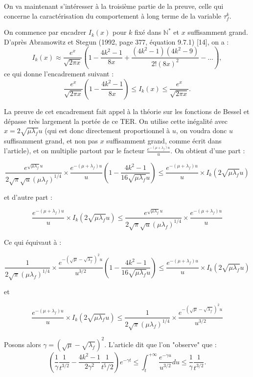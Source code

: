\documentclass[12pt,a4paper]{article}
\begin{document}
On va maintenant s'intéresser à la troisième partie de la preuve, celle qui concerne la caractérisation du comportement à long terme de la variable $\tau_f^k$. \par 

On commence par encadrer $I_k(x)$ pour $k$ fixé dans $\mathbb{N}^*$ et $x$ suffisamment grand. D'après Abramowitz et Stegun (1992, page 377, équation 9.7.1) [14], on a : 
$$ I_k(x) \approx \frac{e^x}{\sqrt{2\pi x}} (1 - \frac{4k^2-1}{8x} + \frac{(4k^2-1)(4k^2-9)}{2! (8x)^2} - ...), $$
ce qui donne l'encadrement suivant : 
\begin{equation}
    \frac{e^x}{\sqrt{2\pi x}} (1 - \frac{4k^2 -1}{8x}) \leq I_k(x) \leq  \frac{e^x}{\sqrt{2\pi x}}.
\end{equation}


La preuve de cet encadrement fait appel à la théorie sur les fonctions de Bessel et dépasse très largement la portée de ce TER. 
On utilise cette inégalité avec $x=2\sqrt{\mu \lambda_f}u$ (qui est donc directement proportionnel à $u$, on voudra donc $u$ suffisamment grand, et non pas $x$ suffisamment grand, comme écrit dans l'article), et on multiplie partout par le facteur $\frac{e^{-(\mu+\lambda_f)u}}{u}$. On obtient d'une part :

$$ \frac{e^{\sqrt{\mu \lambda_f}u}}{2\sqrt{\pi}\sqrt{u}(\mu \lambda_f)^{1/4}} \times \frac{e^{-(\mu+\lambda_f)u}}{u} (1 - \frac{4k^2-1}{16\sqrt{\mu \lambda_f}u}) \leq \frac{e^{-(\mu+\lambda_f)u}}{u} \times I_k(2\sqrt{\mu \lambda_f}u) $$

et d'autre part : 

$$ \frac{e^{-(\mu+\lambda_f)u}}{u} \times I_k(2\sqrt{\mu \lambda_f}u) \leq \frac{e^{\sqrt{\mu \lambda_f}u}}{2\sqrt{\pi}\sqrt{u}(\mu \lambda_f)^{1/4}} \times \frac{e^{-(\mu+\lambda_f)u}}{u} $$

Ce qui équivaut à : 

$$ \frac{1}{2\sqrt{\pi}(\mu \lambda_f)^{1/4}} \times \frac{e^{-(\sqrt{\mu}-\sqrt{\lambda_f})^2 u}}{u^{3/2}} (1 - \frac{4k^2-1}{16\sqrt{\mu \lambda_f}u}) \leq \frac{e^{-(\mu+\lambda_f)u}}{u} \times I_k(2\sqrt{\mu \lambda_f}u) $$

et 

\begin{equation}
    \frac{e^{-(\mu+\lambda_f)u}}{u} \times I_k(2\sqrt{\mu \lambda_f}u) \leq \frac{1}{2\sqrt{\pi}(\mu \lambda_f)^{1/4}} \times \frac{e^{-(\sqrt{\mu}-\sqrt{\lambda_f})^2 u}}{u^{3/2}}
\end{equation}


Posons alors $\gamma = (\sqrt{\mu} - \sqrt{\lambda_f})^2$. L'article dit que l'on "observe" que : 
\begin{equation}
    (\frac{1}{\gamma}\frac{1}{t^{3/2}}-\frac{4k^2-1}{2\gamma^2}\frac{1}{t{^5/2}}) e^{-\gamma t} \leq \int_t^{+\infty}\frac{e^{-\gamma u}}{u^{3/2}} du \leq \frac{1}{\gamma}\frac{1}{t^{3/2}}.
\end{equation}
\end{document}
